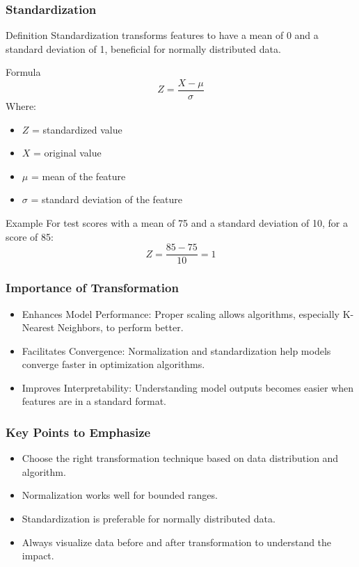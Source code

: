 \documentclass[aspectratio=169]{beamer}
\begin{document}
\begin{frame}[fragile]
    \frametitle{Standardization}
    \begin{block}{Definition}
        Standardization transforms features to have a mean of 0 and a standard deviation of 1, beneficial for normally distributed data.
    \end{block}
    \begin{block}{Formula}
        \begin{equation}
        Z = \frac{X - \mu}{\sigma}
        \end{equation}
    Where:
        \begin{itemize}
            \item \(Z\) = standardized value
            \item \(X\) = original value
            \item \(\mu\) = mean of the feature 
            \item \(\sigma\) = standard deviation of the feature 
        \end{itemize}
    \end{block}
    \begin{block}{Example}
        For test scores with a mean of 75 and a standard deviation of 10, for a score of 85:
        \begin{equation}
        Z = \frac{85 - 75}{10} = 1
        \end{equation}
    \end{block}
\end{frame}

\begin{frame}[fragile]
    \frametitle{Importance of Transformation}
    \begin{itemize}
        \item Enhances Model Performance: Proper scaling allows algorithms, especially K-Nearest Neighbors, to perform better.
        \item Facilitates Convergence: Normalization and standardization help models converge faster in optimization algorithms.
        \item Improves Interpretability: Understanding model outputs becomes easier when features are in a standard format.
    \end{itemize}
\end{frame}

\begin{frame}[fragile]
    \frametitle{Key Points to Emphasize}
    \begin{itemize}
        \item Choose the right transformation technique based on data distribution and algorithm.
        \item Normalization works well for bounded ranges.
        \item Standardization is preferable for normally distributed data.
        \item Always visualize data before and after transformation to understand the impact.
    \end{itemize}
\end{frame}
\end{document}
